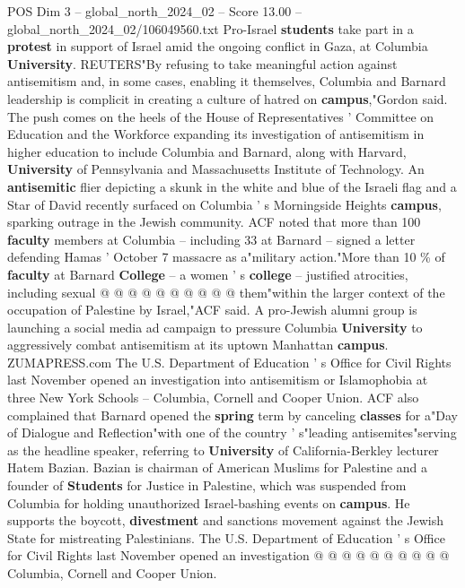 \begin{textsample}{POS Dim 3 – global\_north\_2024\_02 – Score 13.00 – global\_north\_2024\_02/106049560.txt}  \label{ex:f3_pos_253}
Pro-Israel \textbf{students} take part in a \textbf{protest} in support of Israel amid the ongoing conflict in Gaza, at Columbia \textbf{University}.
REUTERS"By refusing to take meaningful action against antisemitism and, in some cases, enabling it themselves, Columbia and Barnard leadership is complicit in creating a culture of hatred on \textbf{campus},"Gordon said.
The push comes on the heels of the House of Representatives ' Committee on Education and the Workforce expanding its investigation of antisemitism in higher education to include Columbia and Barnard, along with Harvard, \textbf{University} of Pennsylvania and Massachusetts Institute of Technology.
An \textbf{antisemitic} flier depicting a skunk in the white and blue of the Israeli flag and a Star of David recently surfaced on Columbia ' s Morningside Heights \textbf{campus}, sparking outrage in the Jewish community.
ACF noted that more than 100 \textbf{faculty} members at Columbia -- including 33 at Barnard -- signed a letter defending Hamas ' October 7 massacre as a"military action."More than 10 \% of \textbf{faculty} at Barnard \textbf{College} -- a women ' s \textbf{college} -- justified atrocities, including sexual @ @ @ @ @ @ @ @ @ @ them"within the larger context of the occupation of Palestine by Israel,"ACF said.
A pro-Jewish alumni group is launching a social media ad campaign to pressure Columbia \textbf{University} to aggressively combat antisemitism at its uptown Manhattan \textbf{campus}.
ZUMAPRESS.com The U.S.
Department of Education ' s Office for Civil Rights last November opened an investigation into antisemitism or Islamophobia at three New York Schools -- Columbia, Cornell and Cooper Union.
ACF also complained that Barnard opened the \textbf{spring} term by canceling \textbf{classes} for a"Day of Dialogue and Reflection"with one of the country ' s"leading antisemites"serving as the headline speaker, referring to \textbf{University} of California-Berkley lecturer Hatem Bazian.
Bazian is chairman of American Muslims for Palestine and a founder of \textbf{Students} for Justice in Palestine, which was suspended from Columbia for holding unauthorized Israel-bashing events on \textbf{campus}.
He supports the boycott, \textbf{divestment} and sanctions movement against the Jewish State for mistreating Palestinians.
The U.S.
Department of Education ' s Office for Civil Rights last November opened an investigation @ @ @ @ @ @ @ @ @ @ Columbia, Cornell and Cooper Union.

\end{textsample}
